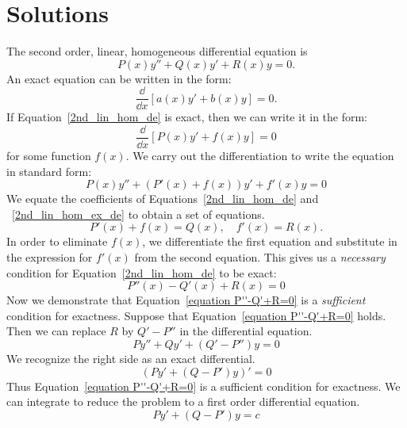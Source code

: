 \raggedbottom
\pagebreak
\flushbottom
\section{Solutions}






\begin{Solution}
  \label{solution second order exact}
  The second order, linear, homogeneous differential equation is
  \begin{equation}
    \label{2nd_lin_hom_de}
    P(x) y'' + Q(x) y' + R(x) y = 0.
  \end{equation}
  An exact equation can be written in the form:
  \[
  \frac{\dd}{\dd x} \left[ a(x) y' + b(x) y \right] = 0.
  \]
  If Equation~\ref{2nd_lin_hom_de} is exact, then we can write it in
  the form:
  \[
  \frac{\dd}{\dd x} \left[ P(x) y' + f(x) y \right] = 0
  \]
  for some function $f(x)$.  We carry out the differentiation to 
  write the equation in standard form:
  \begin{equation}
    \label{2nd_lin_hom_ex_de}
    P(x) y'' + \left( P'(x) + f(x) \right) y' + f'(x) y = 0
  \end{equation}
  We equate the coefficients of Equations~\ref{2nd_lin_hom_de} and 
  ~\ref{2nd_lin_hom_ex_de} to obtain a set of equations.
  \[
  P'(x) + f(x) = Q(x), \quad f'(x) = R(x).
  \]
  In order to eliminate $f(x)$, 
  we differentiate the first equation and substitute in the expression for
  $f'(x)$ from the second equation.  This gives us a \textit{necessary}
  condition for Equation~\ref{2nd_lin_hom_de} to be exact:
  \begin{equation}
    \label{equation P''-Q'+R=0}
    \boxed{
      P''(x) - Q'(x) + R(x) = 0
      }
  \end{equation}
  Now we demonstrate that Equation~\ref{equation P''-Q'+R=0} is a 
  \textit{sufficient} condition for exactness. Suppose that
  Equation~\ref{equation P''-Q'+R=0} holds.  Then we can replace
  $R$ by $Q' - P''$ in the differential equation.
  \[
  P y'' + Q y' + (Q' - P'') y = 0
  \]
  We recognize the right side as an exact differential.
  \[
  (P y' + (Q - P') y)' = 0
  \]
  Thus Equation~\ref{equation P''-Q'+R=0} is a sufficient condition 
  for exactness.  We can integrate to reduce the problem to a first 
  order differential equation.
  \[
  P y' + (Q - P') y = c
  \]
\end{Solution}


